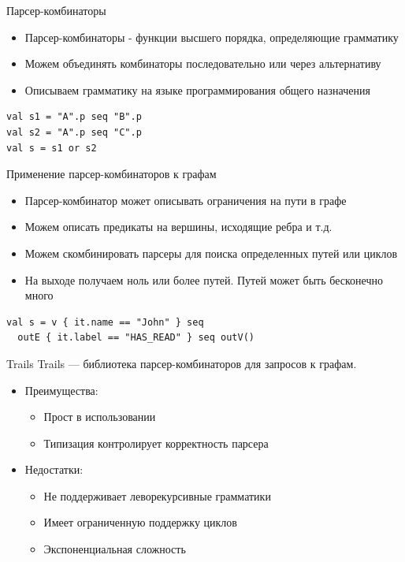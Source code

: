 \documentclass[aspectratio=169]{beamer}
\begin{document}
\begin{frame}[fragile]{Парсер-комбинаторы}
  \begin{itemize}
    \item Парсер-комбинаторы - функции высшего порядка, определяющие грамматику
    \item Можем объединять комбинаторы последовательно или через альтернативу
    \item Описываем грамматику на языке программирования общего назначения
  \end{itemize}


  \begin{verbatim}
val s1 = "A".p seq "B".p
val s2 = "A".p seq "C".p
val s = s1 or s2
  \end{verbatim}
\end{frame}


\begin{frame}[fragile]{Применение парсер-комбинаторов к графам}
  \begin{itemize}
    \item Парсер-комбинатор может описывать ограничения на пути в графе
    \item Можем описать предикаты на вершины, исходящие ребра и т.д.
    \item Можем скомбинировать парсеры для поиска определенных путей или циклов
    \item На выходе получаем ноль или более путей. Путей может быть бесконечно много
  \end{itemize}

  \begin{verbatim}
val s = v { it.name == "John" } seq 
  outE { it.label == "HAS_READ" } seq outV()
\end{verbatim}
\end{frame}

\begin{frame}{Trails}
  Trails --- библиотека парсер-комбинаторов для запросов к графам.
  \begin{itemize}
    \item Преимущества:
          \begin{itemize}
            \item Прост в использовании
            \item Типизация контролирует корректность парсера
          \end{itemize}
          \vspace{0.5cm}
    \item Недостатки:
          \begin{itemize}
            \item Не поддерживает леворекурсивные грамматики
            \item Имеет ограниченную поддержку циклов
            \item Экспоненциальная сложность
          \end{itemize}
  \end{itemize}
\end{frame}
\end{document}
